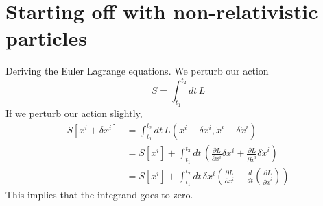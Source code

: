 \section{Starting off with non-relativistic particles} 
Deriving the Euler Lagrange equations. We perturb our action \[ S = \int_{t_1}^{t_2} dt \, L \] 
If we perturb our action slightly, 
\begin{align*} 
 S[x^i + \delta x^i ]& = \int_{t_1}^{t_2} dt \, L( x^i + \delta x^i, \dot{x}^i + \delta  \dot{x}^i ) \\ 
& = S[x^i ] + \int_{t_1}^{t_2} dt \, \left( \frac{ \partial L}{\partial x^i } \delta x^i + \frac{ \partial L }{ \partial \dot{x}^i } \delta \dot{x} ^i \right) \\
& = S[x^i] + \int_{ t_1 }^{t_2} dt \, \delta x^i \left( \frac{ \partial L }{ \partial x^i }  - \frac{d}{dt} \left( \frac{ \partial L }{ \partial \dot{x}^i } \right) \right ) 
\end{align*} 
This implies that the integrand goes to zero. 

